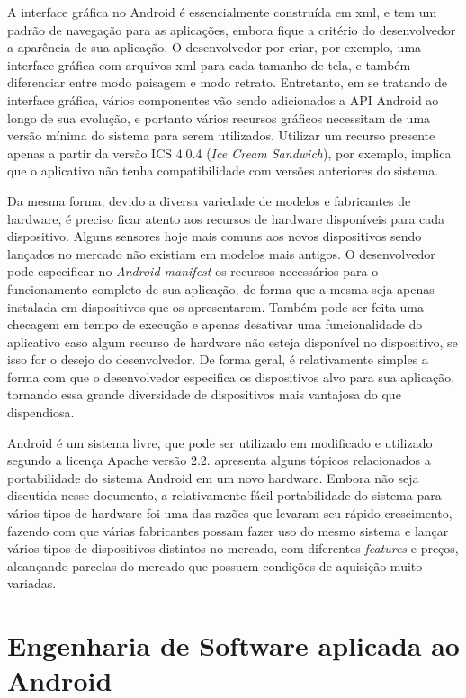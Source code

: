 A interface gráfica no Android é essencialmente construída em xml, e tem um padrão de navegação para as aplicações, embora fique a critério do desenvolvedor a aparência de sua aplicação. O desenvolvedor por criar, por exemplo, uma interface gráfica com arquivos xml para cada tamanho de tela, e também diferenciar entre modo paisagem e modo retrato. Entretanto, em se tratando de interface gráfica, vários componentes vão sendo adicionados a API Android ao longo de sua evolução, e portanto vários recursos gráficos necessitam de uma versão mínima do sistema para serem utilizados. Utilizar um recurso presente apenas a partir da versão ICS 4.0.4 (\textit{Ice Cream Sandwich}), por exemplo, implica que o aplicativo não tenha compatibilidade com versões anteriores do sistema.  

Da mesma forma, devido a diversa variedade de modelos e fabricantes de hardware, é preciso ficar atento aos recursos de hardware disponíveis para cada dispositivo. Alguns sensores hoje mais comuns aos novos dispositivos sendo lançados no mercado não existiam em modelos mais antigos. O desenvolvedor pode especificar no \textit{Android manifest} os recursos necessários para o funcionamento completo de sua aplicação, de forma que a mesma seja apenas instalada em dispositivos que os apresentarem. Também pode ser feita uma checagem em tempo de execução e apenas desativar uma funcionalidade do aplicativo caso algum recurso de hardware não esteja disponível no dispositivo, se isso for o desejo do desenvolvedor. De forma geral, é relativamente simples a forma com que o desenvolvedor especifica os dispositivos alvo para sua aplicação, tornando essa grande diversidade de dispositivos mais vantajosa do que dispendiosa. 

Android é um sistema livre, que pode ser utilizado em modificado e utilizado segundo a licença Apache versão 2.2.  apresenta alguns tópicos relacionados a portabilidade do sistema Android em um novo hardware. Embora não seja discutida nesse documento, a relativamente fácil portabilidade do sistema para vários tipos de hardware foi uma das razões que levaram seu rápido crescimento, fazendo com que várias fabricantes possam fazer uso do mesmo sistema e lançar vários tipos de dispositivos distintos no mercado, com diferentes \textit{features} e preços, alcançando parcelas do mercado que possuem condições de aquisição muito variadas.

\section{Engenharia de Software aplicada ao Android}

